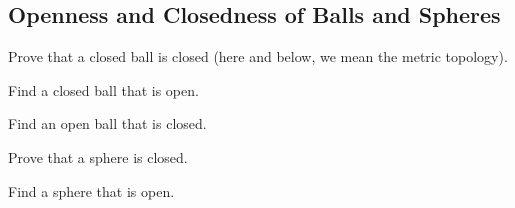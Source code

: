 \subsection{Openness and Closedness of Balls and Spheres}

\begin{minorEx}
    Prove that a closed ball is closed (here and below, we mean the metric
    topology).
\end{minorEx}

\begin{minorEx}
    Find a closed ball that is open.
\end{minorEx}

\begin{minorEx}
    Find an open ball that is closed.
\end{minorEx}

\begin{minorEx}
    Prove that a sphere is closed.
\end{minorEx}

\begin{minorEx}
    Find a sphere that is open.
\end{minorEx}
